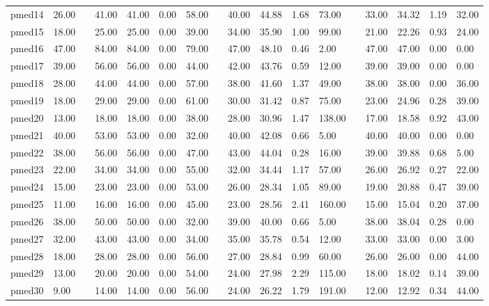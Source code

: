 \begin{table}[H]
\begin{tabularx}{\textwidth}{XXlXXXXlXXXXlXXXX}
    pmed14 & 26.00 && 41.00 & 41.00 & 0.00 & 58.00 && 40.00 & 44.88 & 1.68 & 73.00 && 33.00 & 34.32 & 1.19 & 32.00\\
    pmed15 & 18.00 && 25.00 & 25.00 & 0.00 & 39.00 && 34.00 & 35.90 & 1.00 & 99.00 && 21.00 & 22.26 & 0.93 & 24.00\\
    pmed16 & 47.00 && 84.00 & 84.00 & 0.00 & 79.00 && 47.00 & 48.10 & 0.46 & 2.00 && 47.00 & 47.00 & 0.00 & 0.00\\
    pmed17 & 39.00 && 56.00 & 56.00 & 0.00 & 44.00 && 42.00 & 43.76 & 0.59 & 12.00 && 39.00 & 39.00 & 0.00 & 0.00\\
    pmed18 & 28.00 && 44.00 & 44.00 & 0.00 & 57.00 && 38.00 & 41.60 & 1.37 & 49.00 && 38.00 & 38.00 & 0.00 & 36.00\\
    pmed19 & 18.00 && 29.00 & 29.00 & 0.00 & 61.00 && 30.00 & 31.42 & 0.87 & 75.00 && 23.00 & 24.96 & 0.28 & 39.00\\
    pmed20 & 13.00 && 18.00 & 18.00 & 0.00 & 38.00 && 28.00 & 30.96 & 1.47 & 138.00 && 17.00 & 18.58 & 0.92 & 43.00\\
    pmed21 & 40.00 && 53.00 & 53.00 & 0.00 & 32.00 && 40.00 & 42.08 & 0.66 & 5.00 && 40.00 & 40.00 & 0.00 & 0.00\\
    pmed22 & 38.00 && 56.00 & 56.00 & 0.00 & 47.00 && 43.00 & 44.04 & 0.28 & 16.00 && 39.00 & 39.88 & 0.68 & 5.00\\
    pmed23 & 22.00 && 34.00 & 34.00 & 0.00 & 55.00 && 32.00 & 34.44 & 1.17 & 57.00 && 26.00 & 26.92 & 0.27 & 22.00\\
    pmed24 & 15.00 && 23.00 & 23.00 & 0.00 & 53.00 && 26.00 & 28.34 & 1.05 & 89.00 && 19.00 & 20.88 & 0.47 & 39.00\\
    pmed25 & 11.00 && 16.00 & 16.00 & 0.00 & 45.00 && 23.00 & 28.56 & 2.41 & 160.00 && 15.00 & 15.04 & 0.20 & 37.00\\
    pmed26 & 38.00 && 50.00 & 50.00 & 0.00 & 32.00 && 39.00 & 40.00 & 0.66 & 5.00 && 38.00 & 38.04 & 0.28 & 0.00\\
    pmed27 & 32.00 && 43.00 & 43.00 & 0.00 & 34.00 && 35.00 & 35.78 & 0.54 & 12.00 && 33.00 & 33.00 & 0.00 & 3.00\\
    pmed28 & 18.00 && 28.00 & 28.00 & 0.00 & 56.00 && 27.00 & 28.84 & 0.99 & 60.00 && 26.00 & 26.00 & 0.00 & 44.00\\
    pmed29 & 13.00 && 20.00 & 20.00 & 0.00 & 54.00 && 24.00 & 27.98 & 2.29 & 115.00 && 18.00 & 18.02 & 0.14 & 39.00\\
    pmed30 & 9.00 && 14.00 & 14.00 & 0.00 & 56.00 && 24.00 & 26.22 & 1.79 & 191.00 && 12.00 & 12.92 & 0.34 & 44.00\\

\end{tabularx}
\end{table}
